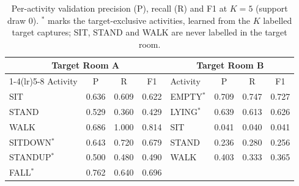 \begin{table}[t]
  \centering
  \caption{Per-activity validation precision (P), recall (R) and F1 at $K = 5$ (support draw 0). $^{*}$ marks the target-exclusive activities, learned from the $K$ labelled target captures; SIT, STAND and WALK are never labelled in the target room.}
  \label{tab:per_class_k5}
  \begin{tabular}{lccc@{\qquad}lccc}
    \toprule
    \multicolumn{4}{c}{\textbf{Target Room A}} & \multicolumn{4}{c}{\textbf{Target Room B}} \\
    \cmidrule(lr){1-4}\cmidrule(lr){5-8}
    Activity & P & R & F1 & Activity & P & R & F1 \\
    \midrule
    SIT & 0.636 & 0.609 & 0.622 & EMPTY$^{*}$ & 0.709 & 0.747 & 0.727 \\
    STAND & 0.529 & 0.360 & 0.429 & LYING$^{*}$ & 0.639 & 0.613 & 0.626 \\
    WALK & 0.686 & 1.000 & 0.814 & SIT & 0.041 & 0.040 & 0.041 \\
    SITDOWN$^{*}$ & 0.643 & 0.720 & 0.679 & STAND & 0.236 & 0.280 & 0.256 \\
    STANDUP$^{*}$ & 0.500 & 0.480 & 0.490 & WALK & 0.403 & 0.333 & 0.365 \\
    FALL$^{*}$ & 0.762 & 0.640 & 0.696 &  &  &  &  \\
    \bottomrule
  \end{tabular}
\end{table}
